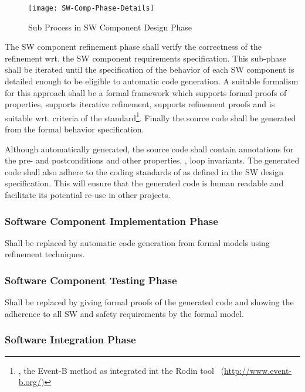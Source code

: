 \begin{figure}[ht]
  \centering
  \texttt{[image: SW-Comp-Phase-Details]}
  \caption{Sub Process in SW Component Design Phase}
  \label{fig:detailed-sw-comp-phase}
\end{figure}

The SW component refinement phase shall verify the correctness of the refinement
wrt. the SW component requirements specification. This sub-phase shall be
iterated until the specification of the behavior of each SW component is
detailed enough to be eligible to automatic code generation. A suitable
formalism for this approach shall be a formal framework which supports formal
proofs of properties, supports iterative refinement, supports refinement proofs
and is suitable wrt. criteria of the standard\footnote{\eg, the Event-B method
  as integrated int the Rodin tool~\cite{Abrial:Rodin}
  (\url{http://www.event-b.org/})}. Finally the source code shall be generated
from the formal behavior specification.

Although automatically generated, the source code shall contain annotations for
the pre- and postconditions and other properties, \eg, loop invariants. The
generated code shall also adhere to the coding standards of as defined in the SW
design specification. This will ensure that the generated code is human readable
and facilitate its potential re-use in other projects.


\subsubsection{Software Component Implementation Phase}
\label{sec:softw-comp-impl}

Shall be replaced by automatic code generation from formal models using
refinement techniques.

\subsubsection{Software Component Testing Phase}
\label{sec:softw-comp-test}

Shall be replaced by giving formal proofs of the generated code and showing the
adherence to all SW and safety requirements by the formal model.

\subsubsection{Software Integration Phase}
\label{sec:softw-integr-phase}


